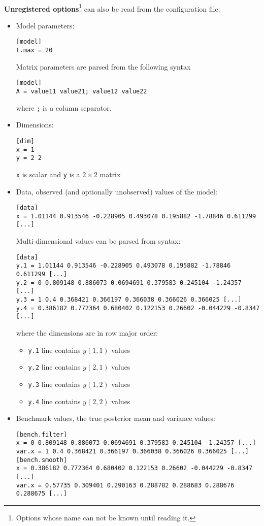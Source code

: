 \paragraph{}
\textbf{Unregistered options}\footnote{Options whose name can not be known until reading it.} can also be read from the configuration file:
\begin{itemize}

\item Model parameters:
\begin{verbatim}
[model]
t.max = 20
\end{verbatim}
Matrix parameters are parsed from the following syntax
\begin{verbatim}
[model]
A = value11 value21; value12 value22
\end{verbatim}
where \verb!;! is a column separator.

\item Dimensions:
\begin{verbatim}
[dim]
x = 1
y = 2 2
\end{verbatim}
\verb!x! is scalar and \verb!y! is a $2 \times 2$ matrix

\item Data, \ie{} observed (and optionally unobserved) values of the model:
\begin{verbatim}
[data]
x = 1.01144 0.913546 -0.228905 0.493078 0.195882 -1.78846 0.611299 [...]
\end{verbatim}
Multi-dimensional values can be parsed from syntax:
\begin{verbatim}
[data]
y.1 = 1.01144 0.913546 -0.228905 0.493078 0.195882 -1.78846 0.611299 [...]
y.2 = 0 0.809148 0.886073 0.0694691 0.379583 0.245104 -1.24357 [...]
y.3 = 1 0.4 0.368421 0.366197 0.366038 0.366026 0.366025 [...]
y.4 = 0.386182 0.772364 0.680402 0.122153 0.26602 -0.044229 -0.8347 [...]
\end{verbatim}
where the dimensions are in row major order:
 \begin{itemize}
   \item \verb!y.1! line contains $y(1,1)$ values
   \item \verb!y.2! line contains $y(2,1)$ values
   \item \verb!y.3! line contains $y(1,2)$ values
   \item \verb!y.4! line contains $y(2,2)$ values
 \end{itemize}

\item Benchmark values, \ie{} the true posterior mean and variance values:
\begin{verbatim}
[bench.filter]
x = 0 0.809148 0.886073 0.0694691 0.379583 0.245104 -1.24357 [...]
var.x = 1 0.4 0.368421 0.366197 0.366038 0.366026 0.366025 [...]
[bench.smooth]
x = 0.386182 0.772364 0.680402 0.122153 0.26602 -0.044229 -0.8347 [...]
var.x = 0.57735 0.309401 0.290163 0.288782 0.288683 0.288676 0.288675 [...]
\end{verbatim}


\end{itemize}
